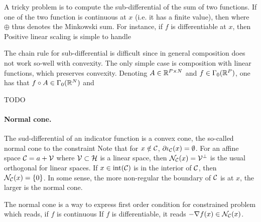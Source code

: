 A tricky problem is to compute the sub-differential of the sum of two functions. If one of the two function is continuous at $x$ (i.e. it has a finite value), then 
where $\oplus$ thus denotes the Minkowski sum. For instance, if $f$ is differentiable at $x$, then 
Positive linear scaling is simple to handle

The chain rule for sub-differential is difficult since in general composition does not work so-well with convexity. 
%
The only simple case is composition with linear functions, which preserves convexity. Denoting $A \in \mathbb{R}^{P \times N}$ and $f \in \Gamma_0(\mathbb{R}^P)$, one has that $f \circ A \in \Gamma_0(\mathbb{R}^N)$ and

\begin{rem}
	{\color{red} TODO}
\end{rem}

\paragraph{Normal cone.}


The sud-differential of an indicator function is a convex cone, the so-called normal cone to the constraint
Note that for $x \notin \mathcal{C}$, $\partial  \iota_{\mathcal{C}}(x) = \emptyset$.
%
For an affine space $\mathcal{C} = a+\mathcal{V}$ where $\mathcal{V} \subset \mathcal{H}$ is a linear space, then $\mathcal{N}_{\mathcal{C}}(x)=\mathcal{V}^\bot$ is the usual orthogonal for linear spaces. If $x \in \operatorname{int}(\mathcal{C})$ is in the interior of $\mathcal{C}$, then $\mathcal{N}_{\mathcal{C}}(x)=\{0\}$. In some sense, the more non-regular the boundary of $\mathcal{C}$ is at $x$, the larger is the normal cone. 






The normal cone is a way to express first order condition for constrained problem
which reads, if $f$ is continuous
If $f$ is differentiable, it reads $-\nabla f(x) \in \mathcal{N}_{\mathcal{C}}(x)$.



